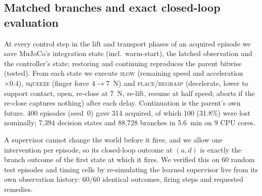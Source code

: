 \documentclass[conference]{IEEEtran}
\newcommand{\remedy}[1]{\textsc{#1}}
\newcommand{\age}{a}
\newcommand{\del}{d}
\begin{document}
\subsection{Matched branches and exact closed-loop evaluation}
At every control step in the lift and transport phases of an acquired episode we save MuJoCo's integration state (incl.\ warm-start), the latched observation and the controller's state; restoring and continuing reproduces the parent bitwise (tested). From each state we execute \remedy{slow} (remaining speed and acceleration $\times0.4$), \remedy{squeeze} (finger force $4\to7$~N) and \remedy{place/regrasp} (decelerate, lower to support contact, open, re-close at 7~N, re-lift, resume at half speed; aborts if the re-close captures nothing) after each delay. Continuation is the parent's own future. 400 episodes (seed~0) gave 314 acquired, of which 100 (31.8\%) were lost nominally; 7{,}394 decision states and 88{,}728 branches in 5.6~min on 9 CPU cores.

A supervisor cannot change the world before it fires, and we allow one intervention per episode, so its closed-loop outcome at $(\age,\del)$ is exactly the branch outcome of the first state at which it fires. We verified this on 60 random test episodes and timing cells by re-simulating the learned supervisor live from its own observation history: 60/60 identical outcomes, firing steps and requested remedies.
\end{document}
